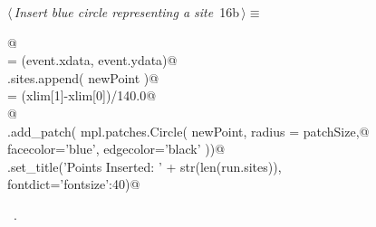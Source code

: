 \documentclass[11.5pt]{report}
\begin{document}
\vspace{-0.8cm} \newchunk
\begin{flushleft} \small
\begin{minipage}{\linewidth}\label{scrap8}\raggedright\small
{} $\langle\,${\itshape Insert blue circle representing a site}\nobreak\ {\footnotesize {16b}}$\,\rangle\equiv$
\vspace{-1ex}
\begin{list}{}{} \item
\mbox{}\verb@  @\\
\mbox{}\verb@newPoint = (event.xdata, event.ydata)@\\
\mbox{}\verb@run.sites.append( newPoint  )@\\
\mbox{}\verb@patchSize  = (xlim[1]-xlim[0])/140.0@\\
\mbox{}\verb@   @\\
\mbox{}\verb@ax.add_patch( mpl.patches.Circle( newPoint, radius = patchSize,@\\
\mbox{}\verb@                                  facecolor='blue', edgecolor='black'  ))@\\
\mbox{}\verb@ax.set_title('Points Inserted: ' + str(len(run.sites)), \@\\
\mbox{}\verb@             fontdict={'fontsize':40})@\\
\mbox{}\verb@@{\NWsep}
\end{list}
\vspace{-1.5ex}
\footnotesize
\begin{list}{}{\setlength{\itemsep}{-\parsep}\setlength{\itemindent}{-\leftmargin}}
\item \NWtxtMacroRefIn\ .

\item{}
\end{list}
\end{minipage}\vspace{4ex}
\end{flushleft}
\end{document}
